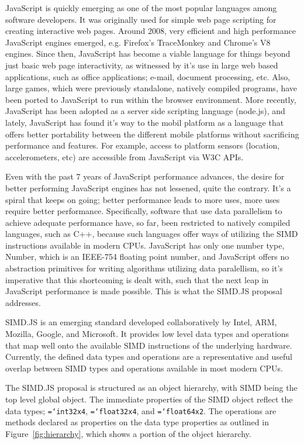 \documentclass[preprint]{sigplanconf}
\newcommand{\ttt}[1]{{\texttt{\hyphenchar\font=`\-\relax #1}}}%
\begin{document}
JavaScript is quickly emerging as one of the most popular languages among 
software developers.  It was originally used for simple web page scripting for 
creating interactive web pages. Around 2008, very efficient and high 
performance JavaScript engines emerged, e.g. Firefox's TraceMonkey and 
Chrome's V8 engines. Since then, JavaScript has become a viable language for 
things beyond just basic web page interactivity, as witnessed by it's use in 
large web based applications, such as office applications; e-mail, document 
processing, etc. Also, large games, which were previously standalone, natively
compiled programs, have been ported to JavaScript to run within the browser 
environment.  More recently, JavaScript has been adopted as a server side 
scripting language (node.js), and lately, JavaScript has found it's way to the
mobil platform as a language that offers better portability between the 
different mobile platforms without sacrificing performance and features.  For 
example, access to platform sensors (location, accelerometers, etc) are 
accessible from JavaScript via W3C APIs.

Even with the past 7 years of JavaScript performance advances, the desire for 
better performing JavaScript engines has not lessened, quite the contrary. It's
a spiral that keeps on going; better performance leads to more uses, more uses 
require better performance.  Specifically, software that use data parallelism 
to achieve adequate performance have, so far, been restricted to natively 
compiled languages, such as C++, because such languages offer ways of utilizing 
the SIMD instructions available in modern CPUs.  JavaScript has only one number
type, Number, which is an IEEE-754 floating point number, and JavaScript offers 
no abstraction primitives for writing algorithms utilizing data paralellism, so 
it's imperative that this shortcoming is dealt with, such that the next leap
in JavaScript performance is made possible.  This is what the SIMD.JS proposal
addresses.

SIMD.JS is an emerging standard developed collaboratively by Intel, ARM,
Mozilla, Google, and Microsoft.  It provides low level data types and 
operations that map well onto the available SIMD instructions of the underlying 
hardware.  Currently, the defined data types and operations are a 
representative and useful overlap between SIMD types and operations available 
in most modern CPUs.

The SIMD.JS proposal is structured as an object hierarchy, with SIMD being the
top level global object.  The immediate properties of the SIMD object reflect
the data types; \ttt{int32x4}, \ttt{float32x4}, and \ttt{float64x2}.  The 
operations are methods declared as properties on the data type properties as 
outlined in  Figure~\ref{fig:hierarchy}, which shows a portion of the object 
hierarchy.
\end{document}
